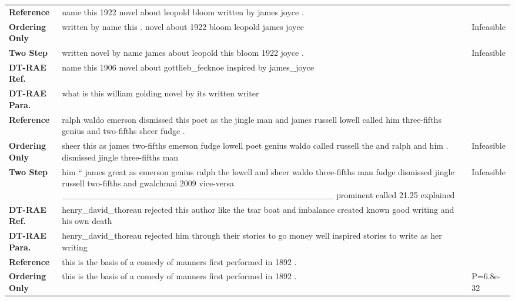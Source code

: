 \documentclass[class=article]{standalone}
\begin{document}
	\newcommand{\collenone}{3cm}
	\newcommand{\collentwo}{10cm}
	\newcommand{\collenthree}{2cm}
	\newcommand{\reftitle}{Reference}
	\newcommand{\oracletitle}{Ordering Only}
	\newcommand{\twosteptitle}{Two Step}
	\newcommand{\iref}{DT-RAE Ref.}
	\newcommand{\ip}{DT-RAE Para.}
	\newcommand{\bm}{VAE Mean}
	\newcommand{\bs}{VAE Sample}
	\begin{table*}
		\small
		\begin{tabular}{ p{\collenone} p{\collentwo} p{\collenthree} }
			
			\textbf{\reftitle}  & name this 1922 novel about leopold bloom written by james joyce . &  \\
			\textbf{\oracletitle}  & written by name this . novel about 1922 bloom leopold james joyce & Infeasible \\
			\textbf{\twosteptitle}  & written novel by name james about leopold this bloom 1922 joyce . & Infeasible \\
			\textbf{\iref}  & name this 1906 novel about gottlieb\_fecknoe inspired by james\_joyce &  \\
			\textbf{\ip}  & what is this william golding novel by its written writer &  \\
			\hline
			\textbf{\reftitle}  & ralph waldo emerson dismissed this poet as the jingle man and james russell lowell called him three-fifths genius and two-fifths sheer fudge . &  \\
			\textbf{\oracletitle}  & sheer this as james two-fifths emerson fudge lowell poet genius waldo called russell the and ralph and him . dismissed jingle three-fifths man & Infeasible \\
			\textbf{\twosteptitle}  & him `` james great as emerson genius ralph the lowell and sheer waldo three-fifths man fudge dismissed jingle russell two-fifths and gwalchmai 2009 vice-versa \_\_\_\_\_\_\_\_\_\_\_\_\_\_\_\_\_\_\_\_\_\_\_\_\_\_\_\_\_\_\_\_\_\_\_\_\_\_\_\_\_\_\_\_ prominent called 21.25 explained & Infeasible \\
			\textbf{\iref}  & henry\_david\_thoreau rejected this author like the tsar boat and imbalance created known good writing and his own death &  \\
			\textbf{\ip}  & henry\_david\_thoreau rejected him through their stories to go money well inspired stories to write as her writing &  \\
			\hline
			\textbf{\reftitle}  & this is the basis of a comedy of manners first performed in 1892 . &  \\
			\textbf{\oracletitle}  & this is the basis of a comedy of manners first performed in 1892 . & P=6.8e-32 \\

\end{tabular}
\end{table*}
\end{document}
